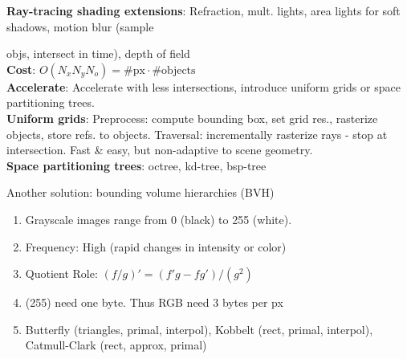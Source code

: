 \textbf{Ray-tracing shading extensions}: Refraction, mult. lights, area lights for soft shadows, motion blur (sample


objs, intersect in time), depth of field \\
\textbf{Cost}: $O\left(N_x N_y N_o\right)=\# \mathrm{px} \cdot \# \mathrm{objects}$ \\
\textbf{Accelerate}: Accelerate with less intersections, introduce uniform grids or space partitioning trees. \\
\textbf{Uniform grids}: Preprocess: compute bounding box, set grid res., rasterize objects, store refs. to objects. Traversal: incrementally rasterize rays - stop at intersection. Fast \& easy, but non-adaptive to scene geometry.\\
 \textbf{Space partitioning trees}: octree, kd-tree, bsp-tree

Another solution: bounding volume hierarchies (BVH)


\begin{enumerate}[leftmargin = *,noitemsep]
\item Grayscale images range from 0 (black) to 255 (white).
\item Frequency: High (rapid changes in intensity or color)
\item Quotient Role: $(f/g)'=(f'g-fg')/(g^2)$
\item (255) need one byte. Thus RGB need $3$ bytes per px
\item Butterfly (triangles, primal, interpol), Kobbelt (rect, primal, interpol), Catmull-Clark (rect, approx, primal)
\end{enumerate}


